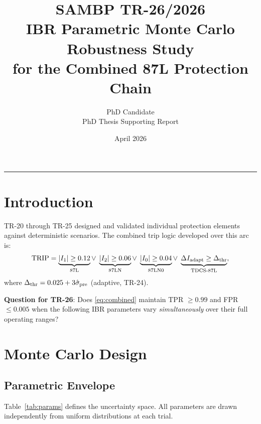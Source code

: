 \documentclass[11pt,a4paper]{article}
\title{%
  \textbf{SAMBP TR-26/2026}\\[4pt]
  IBR Parametric Monte Carlo Robustness Study\\
  for the Combined 87L Protection Chain}
\author{PhD Candidate\\PhD Thesis Supporting Report}
\date{April 2026}
\begin{document}
\maketitle
\tableofcontents
\vspace{6pt}\hrule\vspace{10pt}

\section{Introduction}

TR-20 through TR-25 designed and validated individual protection elements
against deterministic scenarios.  The combined trip logic developed over
this arc is:
\begin{equation}
  \text{TRIP} =
    \underbrace{|I_1| \geq 0.12}_{\text{87L}}
    \vee\;
    \underbrace{|I_2| \geq 0.06}_{\text{87LN}}
    \vee\;
    \underbrace{|I_0| \geq 0.04}_{\text{87LN0}}
    \vee\;
    \underbrace{\Delta I_{\rm adapt} \geq \Delta_{\rm thr}}_{\text{TDCS-87L}},
    \label{eq:combined}
\end{equation}
where $\Delta_{\rm thr} = 0.025 + 3\hat{\sigma}_{\rm pre}$ (adaptive, TR-24).

\textbf{Question for TR-26}: Does \eqref{eq:combined} maintain TPR $\geq 0.99$
and FPR $\leq 0.005$ when the following IBR parameters vary
\emph{simultaneously} over their full operating ranges?

\section{Monte Carlo Design}

\subsection{Parametric Envelope}

Table~\ref{tab:params} defines the uncertainty space.  All parameters are
drawn independently from uniform distributions at each trial.
\end{document}
